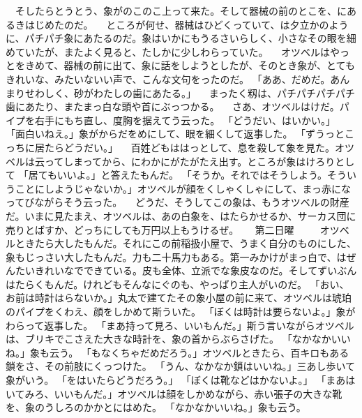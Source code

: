 \documentclass[a5paper, twocolumn]{tbook}
\begin{document}
　そしたらとうとう、象がのこのこ上って来た。そして器械の前のとこを、にあるきはじめたのだ。
　ところが何せ、器械はひどくっていて、は夕立かのように、パチパチ象にあたるのだ。象はいかにもうるさいらしく、小さなその眼を細めていたが、またよく見ると、たしかに少しわらっていた。
　オツベルはやっとをきめて、器械の前に出て、象に話をしようとしたが、そのとき象が、とてもきれいな、みたいないい声で、こんな文句をったのだ。
「ああ、だめだ。あんまりせわしく、砂がわたしの歯にあたる。」
　まったく籾は、パチパチパチパチ歯にあたり、またまっ白な頭や首にぶっつかる。
　さあ、オツベルはけだ。パイプを右手にもち直し、度胸を据えてう云った。
「どうだい、はいかい。」
「面白いねえ。」象がからだをめにして、眼を細くして返事した。
「ずうっとこっちに居たらどうだい。」
　百姓どもははっとして、息を殺して象を見た。オツベルは云ってしまってから、にわかにがたがたえ出す。ところが象はけろりとして
「居てもいいよ。」と答えたもんだ。
「そうか。それではそうしよう。そういうことにしようじゃないか。」オツベルが顔をくしゃくしゃにして、まっ赤になってびながらそう云った。
　どうだ、そうしてこの象は、もうオツベルの財産だ。いまに見たまえ、オツベルは、あの白象を、はたらかせるか、サーカス団に売りとばすか、どっちにしても万円以上もうけるぜ。
　
第二日曜
　
　オツベルときたら大したもんだ。それにこの前稲扱小屋で、うまく自分のものにした、象もじっさい大したもんだ。力も二十馬力もある。第一みかけがまっ白で、はぜんたいきれいなでできている。皮も全体、立派でな象皮なのだ。そしてずいぶんはたらくもんだ。けれどもそんなにぐのも、やっぱり主人がいのだ。
「おい、お前は時計はらないか。」丸太で建てたその象小屋の前に来て、オツベルは琥珀のパイプをくわえ、顔をしかめて斯ういた。
「ぼくは時計は要らないよ。」象がわらって返事した。
「まあ持って見ろ、いいもんだ。」斯う言いながらオツベルは、ブリキでこさえた大きな時計を、象の首からぶらさげた。
「なかなかいいね。」象も云う。
「もなくちゃだめだろう。」オツベルときたら、百キロもある鎖をさ、その前肢にくっつけた。
「うん、なかなか鎖はいいね。」三あし歩いて象がいう。
「をはいたらどうだろう。」
「ぼくは靴などはかないよ。」
「まあはいてみろ、いいもんだ。」オツベルは顔をしかめながら、赤い張子の大きな靴を、象のうしろのかかとにはめた。
「なかなかいいね。」象も云う。
\end{document}

